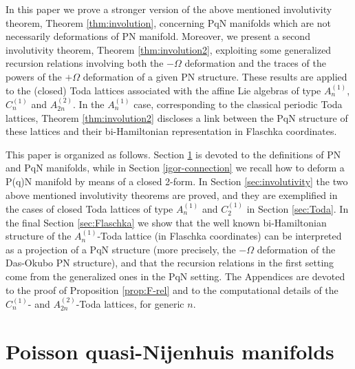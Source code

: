 \documentclass[12pt]{article}
\begin{document}
In this paper we prove a stronger version of the above mentioned involutivity theorem, Theorem \ref{thm:involution}, concerning PqN manifolds which are not necessarily deformations of PN manifold. Moreover, we present a second involutivity theorem, Theorem \ref{thm:involution2}, exploiting some generalized %
recursion relations involving both the $-\Omega$ deformation and the traces of the powers of the $+\Omega$ deformation of a given PN structure. 
These results are applied to the (closed) Toda lattices associated with the affine Lie algebras of type
$A_n^{(1)}$, $C_n^{(1)}$  and $A_{2n}^{(2)}$. 
In the $A_n^{(1)}$ case, corresponding to the classical periodic Toda lattices, Theorem \ref{thm:involution2} discloses a link between the PqN structure of these lattices 
and their bi-Hamiltonian representation in Flaschka coordinates.

This paper is organized as follows. 
Section \ref{sec:PN-PqN} is devoted to the definitions of PN and PqN manifolds, while in 
Section \ref{igor-connection} we recall how to deform a P(q)N manifold by means of a closed 2-form. 
In Section \ref{sec:involutivity} the two above mentioned involutivity theorems are proved, and they are 
exemplified in the cases of closed Toda lattices of type $A^{(1)}_n$ and $C^{(1)}_2$
in Section \ref{sec:Toda}.
In the final Section \ref{sec:Flaschka} we show that the well known bi-Hamiltonian structure of the 
$A_n^{(1)}$-Toda lattice (in Flaschka coordinates) can be interpreted as a projection of a PqN structure (more precisely, the $-\Omega$ deformation of the Das-Okubo PN structure), and that the recursion relations in the first setting come from the generalized ones in the PqN setting. The Appendices are devoted to the proof of Proposition \ref{prop:F-rel} and to the computational details of the $C_n^{(1)}$- and $A_{2n}^{(2)}$-Toda lattices, for generic $n$.


\section{Poisson quasi-Nijenhuis manifolds}
\label{sec:PN-PqN}
\end{document}
